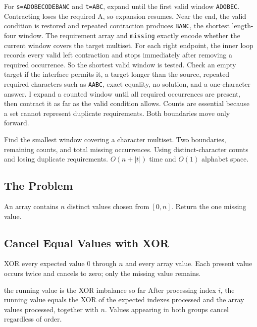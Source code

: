 \lessonexpansion
  {For \texttt{s=ADOBECODEBANC} and \texttt{t=ABC}, expand until the first
   valid window \texttt{ADOBEC}. Contracting loses the required A, so expansion
   resumes. Near the end, the valid condition is restored and repeated contraction
   produces \texttt{BANC}, the shortest length-four window.}
  {The requirement array and \texttt{missing} exactly encode whether the
   current window covers the target multiset. For each right endpoint, the
   inner loop records every valid left contraction and stops immediately after
   removing a required occurrence. So the shortest valid window is tested.}
  {Check an empty target if the interface permits it, a target longer than the
   source, repeated required characters such as \texttt{AABC}, exact equality,
   no solution, and a one-character answer.}
  {I expand a counted window until all required occurrences are present, then
   contract it as far as the valid condition allows. Counts are essential because a set
   cannot represent duplicate requirements. Both boundaries move only forward.}

\chaptercheckpoint
  {Find the smallest window covering a character multiset.}
  {Two boundaries, remaining counts, and total missing occurrences.}
  {Using distinct-character counts and losing duplicate requirements.}
  {$O(n+|t|)$ time and $O(1)$ alphabet space.}



\subsection{The Problem}
An array contains \(n\) distinct values chosen from \([0,n]\). Return the one
missing value.

\subsection{Cancel Equal Values with XOR}
XOR every expected value \(0\) through \(n\) and every array value. Each
present value occurs twice and cancels to zero; only the missing value remains.

\begin{invariantbox}{the running value is the XOR imbalance so far}
After processing index \(i\), the running value equals the XOR of the expected
indexes processed and the array values processed, together with \(n\). Values
appearing in both groups cancel regardless of order.
\end{invariantbox}

